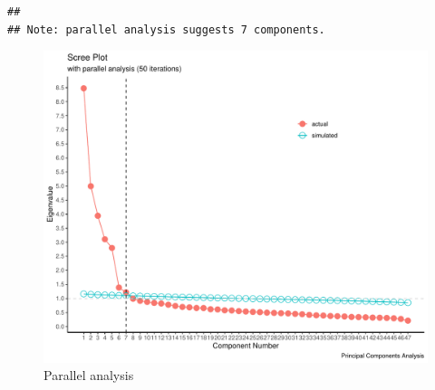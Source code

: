\documentclass[
  english,
  man]{apa6}
\begin{document}
\begin{verbatim}
## 
## Note: parallel analysis suggests 7 components.
\end{verbatim}

\begin{figure}
\centering
\includegraphics{final_project_files/figure-latex/parallel-analysis-1.pdf}
\caption{\label{fig:parallel-analysis}Parallel analysis}
\end{figure}
\end{document}
